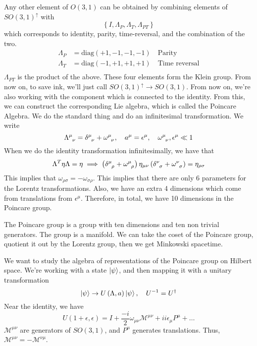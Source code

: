 \documentclass[11pt, oneside]{article}   	%
\theoremstyle{slanted}
\begin{document}
Any other element of $ O \left( 3, 1  \right)  $ 
can be obtained by combining elements of 
$ SO ( 3 , 1 ) ^{ \uparrow } $ with 
\[
 \left\{  I , \Lambda _ P , \Lambda _ T , \Lambda _{ PT }  \right\}  
\] which corresponds to identity, parity, time-reversal, 
and the combination of the two. 
\begin{align*}
	\Lambda_ P &  = \text{diag}\left( + 1, -1 , -1, -1  \right) \quad \text{Parity} \\
	\Lambda _ T &=  \text{diag} \left( -1, +1, + 1, + 1  \right)  \quad \text{Time reversal} \\
\end{align*} 
$ \Lambda_{ PT}$ is the product of the above. 
These four elements form the Klein group. 
From now on, to save ink, we'll just call $ SO ( 3, 1 ) ^{ \uparrow } \to SO ( 3, 1 ) $. 
From now on, we're also working with the component 
which is connected to the identity. 
From this, we can construct the corresponding Lie algebra, 
which is called the Poincare Algebra. 
We do the standard thing and do an infinitesimal 
transformation. 
We write 
\[
 \Lambda \indices{ ^ \mu _ \nu }  = \delta \indices{ ^ \mu _ \nu  } + 
 \omega \indices{ ^ \mu _ \nu } , \quad a ^ \mu  = \epsilon ^ \mu , \quad 
 \omega \indices{ ^ \mu _ \nu } , \epsilon ^ \mu \ll 1  
\] When we do the identity transformation 
infinitesimally, we have that 
\[
	\Lambda ^  T \eta \Lambda  = \eta \implies \left( 
	\delta \indices{ ^ \mu _ \rho } + \omega \indices{ ^ \mu _ \rho }   \right)  
	\eta _{ \mu \nu } \left( \delta \indices{ ^ \nu _ \sigma } + 
	\omega \indices{ ^ \nu _ \sigma }  \right)   = \eta _{ \rho \sigma }
\] This implies that $ \omega _{ \rho \sigma }  =  - \omega _{ \sigma \rho  } $. 
This implies that there are only $ 6 $ parameters for the Lorentz 
transformations. Also, we have an extra 4 dimensions 
which come from translations from $ \epsilon ^ \mu $. 
Therefore, in total, we have 10 dimensions in the Poincare group. 

The Poincare group is a group with ten dimensions and 
ten non trivial generators. 
The group is a manifold. We can take the coset of the Poincare group, 
quotient it out by the Lorentz group, then we get 
Minkowski spacetime. 

We want to study the algebra of 
representations of the Poincare group on Hilbert space. 
We're working with a state $ \ket{ \psi } $, 
and then mapping it with a unitary transformation 
\[
	\ket{ \psi } \to U \left( \Lambda , a  \right)  \ket{ \psi } , \quad 
	U ^{ -1 }  = U ^{ \dagger }
\] Near the identity, we have 
\[
 U \left( 1 + \epsilon , \epsilon  \right)  = I + \frac{ - i }{ 2 } \omega_{\mu \nu } \mathcal{ M } ^{ \mu \nu } + i i \epsilon _ \mu P ^ \mu + \dots  
\] $\mathcal{ M }^{ \mu \nu } $ 
are generators of $ SO ( 3,1 ) $, and $ P ^ \mu $ 
generates translations. Thus, $ \mathcal{ M } ^{ \mu \nu }  =  - \mathcal{ M } ^{ \nu \mu } $. 
\end{document}
